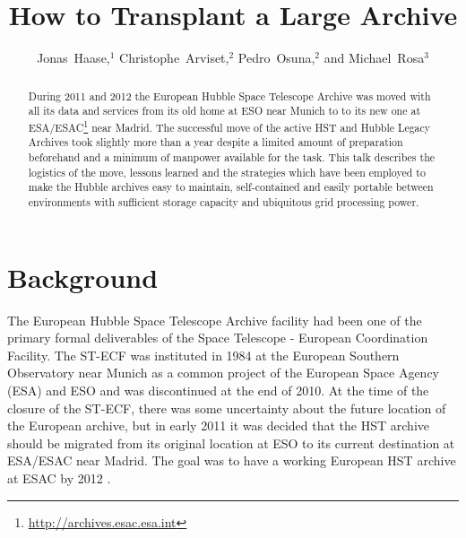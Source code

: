 
\resetcounters




\title{How to Transplant a Large Archive}
\author{Jonas~Haase,$^1$ Christophe~Arviset,$^2$ Pedro~Osuna,$^2$ and Michael~Rosa$^3$}


\begin{abstract}
During 2011 and 2012 the European Hubble Space Telescope Archive was moved with all its data and services from its old home at ESO near Munich to to its new one at ESA/ESAC\footnote{\url{http://archives.esac.esa.int}} near Madrid. The successful move of the active HST and Hubble Legacy Archives took slightly more than a year despite a limited amount of preparation beforehand and a minimum of manpower available for the task.
This talk describes the logistics of the move, lessons learned and the strategies which have been employed to make the Hubble archives easy to maintain, self-contained and easily portable between environments with sufficient storage capacity and ubiquitous grid processing power.


\end{abstract}

\section{Background}

The European Hubble Space Telescope Archive facility had been one of the primary formal deliverables of the Space Telescope - European Coordination Facility. The ST-ECF was instituted in 1984 at the European Southern Observatory near Munich as a common project of the European Space Agency (ESA) and ESO and was discontinued at the end of 2010. 
At the time of the closure of the ST-ECF, there was some uncertainty about the future location of the European archive, but in early 2011 it was decided that the HST archive should be migrated from its original location at ESO to its current destination at ESA/ESAC near Madrid. The goal was to have a working European HST archive at ESAC by 2012 \citep{2012ASPC..461..677H}. 

